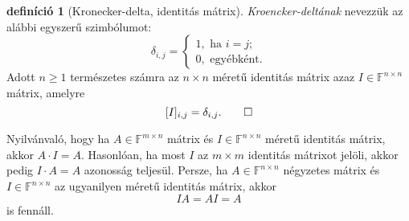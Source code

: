 \documentclass[9pt, a4paper, showtrims]{memoir}
\theoremstyle{plain}
\theoremstyle{remark}
\theoremstyle{definition}
\newtheorem{definition}[proposition]{definíció}
\begin{document}
\begin{definition}[Kronecker-delta, identitás mátrix]
	\emph{Kroencker-deltának} nevezzük az alábbi egyszerű szimbólumot:
	\[
		\delta_{i,j}=
		\begin{cases}
			1,\text{ ha }i=j; \\
			0,\text{ egyébként.}
		\end{cases}
	\]
	Adott $n\geq 1$ természetes számra az $n\times n$ méretű identitás mátrix azaz $I\in\mathbb{F}^{n\times n}$ mátrix,
	amelyre
	\[
		[I]_{i,j}=\delta_{i,j}.\qedhere
	\]
\end{definition}
Nyilvánvaló, hogy ha $A\in\mathbb{F}^{m\times n}$ mátrix és $I\in\mathbb{F}^{n\times n}$ méretű identitás mátrix,
akkor $A\cdot I=A$. Hasonlóan, ha most $I$ az $m\times m$ identitás mátrixot jelöli, akkor pedig $I\cdot A=A$ azonosság teljesül.
Persze, ha $A\in\mathbb{F}^{n\times n}$ négyzetes mátrix és $I\in\mathbb{F}^{n\times n}$ az ugyanilyen méretű identitás mátrix,
akkor
\[
	IA=AI=A
\]
is fennáll.
\end{document}
